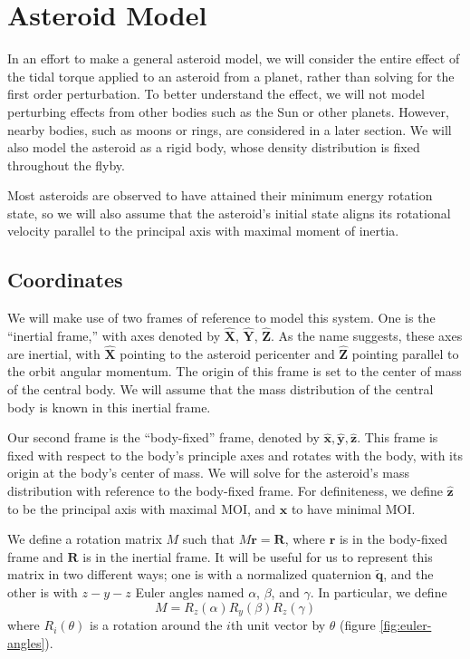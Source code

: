 \documentclass{aastex631}
\newcommand{\unit}[1]{\hat{\bm{#1}}}
\newcommand{\quat}[1]{\widetilde{\bm{#1}}}
\begin{document}
\section{Asteroid Model}
In an effort to make a general asteroid model, we will consider the entire effect of the tidal torque applied to an asteroid from a planet, rather than solving for the first order perturbation. To better understand the effect, we will not model perturbing effects from other bodies such as the Sun or other planets. However, nearby bodies, such as moons or rings, are considered in a later section. We will also model the asteroid as a rigid body, whose density distribution is fixed throughout the flyby.

Most asteroids are observed to have attained their minimum energy rotation state, so we will also assume that the asteroid's initial state aligns its rotational velocity parallel to the principal axis with maximal moment of inertia.

\subsection{Coordinates}
\label{sec:coordinates}
We will make use of two frames of reference to model this system. One is the ``inertial frame,'' with axes denoted by $\unit{X}$, $\unit{Y}$, $\unit{Z}$. As the name suggests, these axes are inertial, with $\unit{X}$ pointing to the asteroid pericenter and $\unit{Z}$ pointing parallel to the orbit angular momentum. The origin of this frame is set to the center of mass of the central body. We will assume that the mass distribution of the central body is known in this inertial frame.

Our second frame is the ``body-fixed'' frame, denoted by $\unit{x}, \unit{y}, \unit{z}$. This frame is fixed with respect to the body's principle axes and rotates with the body, with its origin at the body's center of mass. We will solve for the asteroid's mass distribution with reference to the body-fixed frame. For definiteness, we define $\unit{z}$ to be the principal axis with maximal MOI, and $\unit{x}$ to have minimal MOI.

We define a rotation matrix $M$ such that $M\bm{r} = \bm{R}$, where $\bm{r}$ is in the body-fixed frame and $\bm{R}$ is in the inertial frame. It will be useful for us to represent this matrix in two different ways; one is with a normalized quaternion $\quat q$, and the other is with $z-y-z$ Euler angles named $\alpha$, $\beta$, and $\gamma$. In particular, we define
\begin{equation}
M = R_z(\alpha) R_y(\beta) R_z(\gamma)
\label{eqn:euler-angles}
\end{equation}
where $R_i(\theta)$ is a rotation around the $i$th unit vector by $\theta$ (figure \ref{fig:euler-angles}).
\end{document}
